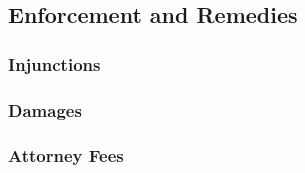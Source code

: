 
\subsection{Enforcement and Remedies}

\subsubsection{Injunctions}


\subsubsection{Damages}


\subsubsection{Attorney Fees}

